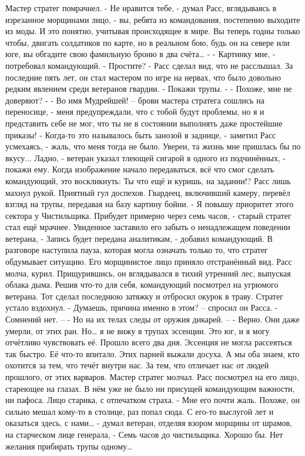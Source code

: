 \documentclass[a4paper, 12pt]{report}
\begin{document}
	Мастер стратег помрачнел. 
- Не нравится тебе, - думал Расс, вглядываясь в изрезанное морщинами лицо, - вы, ребята из командования, постепенно выходите из моды. И это понятно, учитывая происходящее в мире. Вы теперь годны только чтобы, двигать солдатиков по карте, но в реальном бою, будь он на севере или юге, вы обгадите свою фамильную броню в два счёта… -
	- Картинку мне, - потребовал командующий.
	- Простите? - Расс сделал вид, что не расслышал. За последние пять лет, он стал мастером по игре на нервах, что было довольно редким явлением среди ветеранов гвардии. 
	- Покажи трупы. - 
	- Похоже, мне не доверяют? -  
	- Во имя Мудрейшей! – брови мастера стратега сошлись на переносице, - меня предупреждали, что с тобой будут проблемы, но я и представить себе не мог, что ты не в состоянии выполнять даже простейшие приказы! 
	- Когда-то это называлось быть занозой в заднице, - заметил Расс усмехаясь, - жаль, что меня тогда не было. Уверен, та жизнь мне пришлась бы по вкусу... Ладно, - ветеран указал тлеющей сигарой в одного из подчинённых, - покажи ему.
	Когда изображение начало передаваться, всё что смог сделать командующий, это воскликнуть: Ты что ещё и куришь, на задании!? 
	Расс лишь махнул рукой. Приятный гул доспехов. Гвардеец, включивший камеру, перевёл взгляд на трупы, передавая на базу картину бойни.
	- Я повышу приоритет этого сектора у Чистильщика. Прибудет примерно через семь часов, - старый стратег стал ещё мрачнее. Увиденное заставило его забыть о ненадлежащем поведении ветерана, - Запись будет передана аналитикам, - добавил командующий. В разговоре наступила пауза, которая могла означать только то, что стратег обдумывает ситуацию. Его морщинистое лицо приняло отстранённый вид. Расс молча, курил. Прищурившись, он вглядывался в тихий утренний лес, выпуская облака дыма. Решив что-то для себя, командующий посмотрел на угрюмого ветерана. Тот сделал последнюю затяжку и отбросил окурок в траву. Стратег устало вздохнул. 
	- Думаешь, причина именно в этом? – спросил он Расса.
	- Сомнений нет. –
	- Но на их телах следы от оружия дикарей. –
	- Верно. Они даже умерли, от этих ран. Но… я не вижу в трупах эссенции. Это юг, и я могу отчётливо чувствовать её. Прошло всего два дня. Эссенция не могла рассеяться так быстро. Её что-то впитало. Этих парней выжали досуха. А мы оба знаем, кто охотится за тем, что течёт внутри нас. За тем, что отличает нас от людей прошлого, от этих варваров.
Мастер стратег молчал. Расс посмотрел на его лицо, стареющее на глазах. В нём уже не было ни присущей командующим важности, ни пафоса. Лицо старика, с отпечатком страха.
- Мне его почти жаль. Похоже, он сильно мешал кому-то в столице, раз попал сюда. С его-то выслугой лет и оказаться здесь, с нами… - думал ветеран, отделяя взором морщины от шрамов, на старческом лице генерала, - Семь часов до чистильщика. Хорошо бы. Нет желания прибирать трупы одному…
\end{document}
